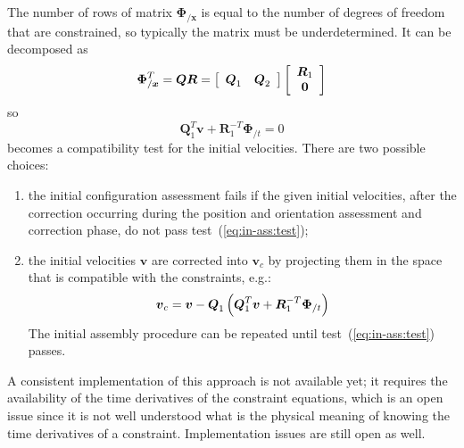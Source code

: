 \documentclass[10pt,dvips,fleqn]{report}
\newcommand{\T}[1]{\boldsymbol{#1}}
\begin{document}
The number of rows of matrix $\T{\Phi}_{/\T{x}}$ is equal to the number 
of degrees of freedom that are constrained, so typically the matrix 
must be underdetermined.
It can be decomposed as
\begin{equation}
	\T{\Phi}_{/\T{x}}^T = \T{Q} \T{R}
		= \sqbr{\matr{cc}{\T{Q}_1 & \T{Q}_2}}\sqbr{\cvvect{\T{R}_1 \\ \T{0}}}
\end{equation}
so
\begin{equation}
	\T{Q}_1^T \T{v} + \T{R}_1^{-T} \T{\Phi}_{/t} = 0
	\label{eq:in-ass:test}
\end{equation}
becomes a compatibility test for the initial velocities.
There are two possible choices:
\begin{enumerate}
\item the initial configuration assessment fails if the given 
initial velocities, after the correction occurring during the position 
and orientation assessment and correction phase, do not pass 
test~(\ref{eq:in-ass:test});
\item the initial velocities $\T{v}$ are corrected into $\T{v}_c$ 
by projecting them in the space that is compatible with the constraints, 
e.g.:
\begin{equation}
	\T{v}_c = \T{v} - \T{Q}_1 \plbr{\T{Q}_1^T \T{v} + \T{R}_1^{-T}\T{\Phi}_{/t}}
\end{equation}
The initial assembly procedure can be repeated until 
test~(\ref{eq:in-ass:test}) passes.
\end{enumerate}
A consistent implementation of this approach is not available yet;
it requires the availability of the time derivatives 
of the constraint equations, which is an open issue since it is not
well understood what is the physical meaning of knowing 
the time derivatives of a constraint.
Implementation issues are still open as well.
\end{document}
